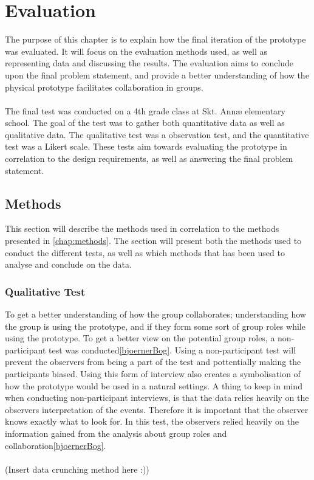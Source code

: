 \chapter{Evaluation}

The purpose of this chapter is to explain how the final iteration of the prototype was evaluated. It will focus on the evaluation methods used, as well as representing data and discussing the results. The evaluation aims to conclude upon the final problem statement, and provide a better understanding of how the physical prototype facilitates collaboration in groups.\\\\

The final test was conducted on a 4th grade class at Skt. Annæ elementary school. The goal of the test was to gather both quantitative data as well as qualitative data. The qualitative test was a observation test, and the quantitative test was a Likert scale. These tests aim towards evaluating the prototype in correlation to the design requirements, as well as answering the final problem statement.

\section{Methods}
This section will describe the methods used in correlation to the methods presented in \autoref{chap:methods}. The section will present both the methods used to conduct the different tests, as well as which methods that has been used to analyse and conclude on the data. 

\subsection{Qualitative Test}
To get a better understanding of how the group collaborates; understanding how the group is using the prototype, and if they form some sort of group roles while using the prototype. To get a better view on the potential group roles, a non-participant test was conducted\ref{bjoernerBog}. Using a non-participant test will prevent the observers from being a part of the test and pottentially making the participants biased. Using this form of interview also creates a symbolisation of how the prototype would be used in a natural settings. A thing to keep in mind when conducting non-participant interviews, is that the data relies heavily on the observers interpretation of the events. Therefore it is important that the observer knows exactly what to look for. In this test, the observers relied heavily on the information gained from the analysis about group roles and collaboration\ref{bjoernerBog}.\\\\
(Insert data crunching method here :))

